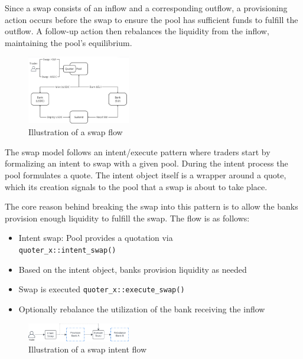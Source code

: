 \documentclass[sigconf,nonacm,prologue,table]{acmart}
\numberwithin{equation}{section}
\theoremstyle{definition}
\theoremstyle{remark}
\begin{document}
Since a swap consists of an inflow and a corresponding outflow, a provisioning action occurs before the swap to ensure the pool has sufficient funds to fulfill the outflow. A follow-up action then rebalances the liquidity from the inflow, maintaining the pool’s equilibrium.

\begin{figure}[htbp]
  \centering
  \includegraphics[width=0.4\textwidth]{assets/swapflow.png}
  \caption{Illustration of a swap flow}
  \label{fig:swap}
\end{figure}

The swap model follows an intent/execute pattern where traders start by formalizing an intent to swap with a given pool. During the intent process the pool formulates a quote. The intent object itself is a wrapper around a quote, which its creation signals to the pool that a swap is about to take place.

The core reason behind breaking the swap into this pattern is to allow the banks provision enough liquidity to fulfill the swap. The flow is as follows:

\begin{itemize}
    \item Intent swap: Pool provides a quotation via \\ \verb|quoter_x::intent_swap()|
    \item Based on the intent object, banks provision liquidity as needed
    \item Swap is executed \verb|quoter_x::execute_swap()|
    \item Optionally rebalance the utilization of the bank receiving the inflow
\end{itemize}

\begin{figure}[htbp]
  \centering
  \includegraphics[width=0.4\textwidth]{assets/swap_intent.png}
  \caption{Illustration of a swap intent flow}
  \label{fig:swapintent}
\end{figure}
\end{document}
